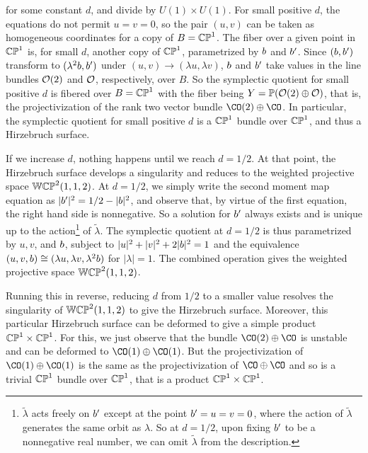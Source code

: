 for some constant $d$, and divide by $U(1)\times U(1)$. For small
positive  $d$, the equations do not permit $u=v=0$, so the pair
$(u,v)$ can be taken as homogeneous coordinates for a copy of
$B=\Bbb{CP}^1$.  The fiber over a given point in $\Bbb{CP}^1$ is,
for small $d$, another copy of $\Bbb{CP}^1$, parametrized by $b$
and $b'$.  Since $(b,b')$ transform to $(\lambda^2b,b')$
under $(u,v)\to (\lambda u,\lambda v)$, $b$ and $b'$ take values
in the line bundles ${\cal O}(2)$ and ${\cal O}$, respectively,
over $B$. So the symplectic quotient for small positive $d$ is
fibered over $B=\Bbb{CP}^1$ with the fiber being $Y=\Bbb{P}({\cal
O}(2)\oplus {\cal O})$, that is, the projectivization of the rank
two vector bundle $\CO(2)\oplus \CO$. In particular, the
symplectic quotient for small positive $d$ is a $\Bbb{CP}^1$
bundle over $\Bbb{CP}^1$, and thus a Hirzebruch surface.

If we increase $d$, nothing happens until we reach $d=1/2$. At
that point, the Hirzebruch surface develops a singularity and
reduces to the weighted projective space $\Bbb{WCP}^2(1,1,2)$. At
$d=1/2$, we simply write the second moment map equation as
$|b'|^2=1/2-|b|^2$, and observe that, by virtue of the first
equation, the right hand side is nonnegative. So a solution for
$b'$ always exists and is unique up to the
action\footnote{$\tilde\lambda$ acts freely on $b'$ except at the
point $b'=u=v=0$, where the action of $\tilde\lambda$ generates
the same orbit as $\lambda$.  So at $d=1/2$, upon fixing $b'$ to
be a nonnegative real number, we can omit $\tilde\lambda$ from the
description.} of $\tilde\lambda$. The symplectic quotient at
$d=1/2$ is thus parametrized by $u,v$, and $b$, subject to
$|u|^2+|v|^2+2|b|^2=1$ and the equivalence $(u,v,b)\cong
(\lambda u,\lambda v,\lambda^2 b)$ for $|\lambda|=1$. The
combined operation gives the weighted projective space
$\Bbb{WCP}^2(1,1,2)$.

Running this in reverse, reducing $d$ from $1/2$ to a smaller
value resolves the singularity of $\Bbb{WCP}^2(1,1,2)$ to give the
Hirzebruch surface.  Moreover, this particular Hirzebruch surface
can be deformed to give a simple product $\Bbb{CP}^1\times
\Bbb{CP}^1$.  For this, we just observe that the bundle
$\CO(2)\oplus \CO$ is unstable and can be deformed to
$\CO(1)\oplus \CO(1)$.  But the projectivization of $\CO(1)\oplus
\CO(1)$ is the same as the projectivization of $\CO\oplus \CO$ and
so is a trivial $\Bbb{CP}^1$ bundle over $\Bbb{CP}^1$, that is a
product $\Bbb{CP}^1\times \Bbb{CP}^1$.

